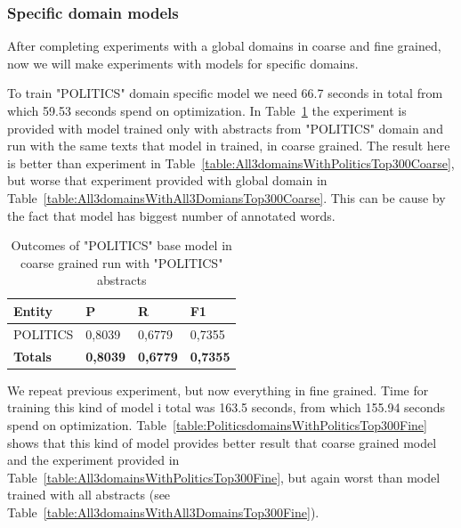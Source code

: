 \documentclass[thesis=M,english]{FITthesis}[2018/05/30]
\begin{document}
\subsubsection{Specific domain models}

	After completing experiments with a global domains in coarse and fine grained, now we will make experiments with models for specific domains.
	
	To train "POLITICS" domain specific model we need 66.7 seconds in total from which 59.53 seconds spend on optimization. In Table~\ref{table:PoliticsdomainsWithPoliticsTop300Coarse} the experiment is provided with model trained only with abstracts from "POLITICS" domain and run with the same texts that model in trained, in coarse grained. The result here is better than experiment in Table~\ref{table:All3domainsWithPoliticsTop300Coarse}, but worse that experiment provided with global domain in Table~\ref{table:All3domainsWithAll3DomiansTop300Coarse}. This can be cause by the fact that model has  biggest number of annotated words.

	\begin{table}[H]\centering
		\begin{tabular}{|l|l|l|l|}
			\hline {\textbf{Entity}} & {\textbf{P}} & {\textbf{R}} & {\textbf{F1}}\\\hline
				POLITICS & 0,8039 & 0,6779 & 0,7355\\\hline
				\textbf{Totals} & \textbf{0,8039} & \textbf{0,6779} & \textbf{0,7355}\\\hline
		\end{tabular}
		\caption{Outcomes of "POLITICS" base model in coarse grained run with "POLITICS" abstracts \label{table:PoliticsdomainsWithPoliticsTop300Coarse}}
	\end{table}
	
	We repeat previous experiment, but now everything in fine grained. Time for training this kind of model i total was 163.5 seconds, from which 155.94 seconds spend on optimization. Table~\ref{table:PoliticsdomainsWithPoliticsTop300Fine} shows that this kind of model provides better result that coarse grained model and the experiment provided in Table~\ref{table:All3domainsWithPoliticsTop300Fine}, but again worst than model trained with all abstracts (see Table~\ref{table:All3domainsWithAll3DomainsTop300Fine}).
	 
\end{document}
